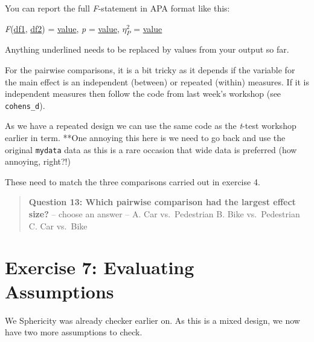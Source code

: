 \documentclass[
]{book}
\newenvironment{Shaded}{\begin{snugshade}}{\end{snugshade}}
\newcommand{\AttributeTok}[1]{\textcolor[rgb]{0.13,0.29,0.53}{#1}}
\newcommand{\ConstantTok}[1]{\textcolor[rgb]{0.56,0.35,0.01}{#1}}
\newcommand{\FunctionTok}[1]{\textcolor[rgb]{0.13,0.29,0.53}{\textbf{#1}}}
\newcommand{\NormalTok}[1]{#1}
\newcommand{\SpecialCharTok}[1]{\textcolor[rgb]{0.81,0.36,0.00}{\textbf{#1}}}
\let\oldsection\section
\renewcommand{\section}{\needspace{5\baselineskip}\oldsection}
\begin{document}
You can report the full \emph{F}-statement in APA format like this:

\emph{F}(\ul{df1}, \ul{df2}) = \ul{value}, \emph{p} = \ul{value}, \(η_P^2\) = \ul{value}

Anything underlined needs to be replaced by values from your output so far.

For the pairwise comparisons, it is a bit tricky as it depends if the variable for the main effect is an independent (between) or repeated (within) measures. If it is independent measures then follow the code from last week's workshop (see \texttt{cohens\_d}).

As we have a repeated design we can use the same code as the \emph{t}-test workshop earlier in term. **One annoying this here is we need to go back and use the original \texttt{mydata} data as this is a rare occasion that wide data is preferred (how annoying, right?!)

\begin{Shaded}
\end{Shaded}

These need to match the three comparisons carried out in exercise 4.

\begin{quote}
\textbf{Question 13: Which pairwise comparison had the largest effect size?} -- choose an answer -- A. Car vs.~Pedestrian B. Bike vs.~Pedestrian C. Car vs.~Bike
\end{quote}

\section{Exercise 7: Evaluating Assumptions}\label{exercise-7-evaluating-assumptions}

We Sphericity was already checker earlier on. As this is a mixed design, we now have two more assumptions to check.
\end{document}
